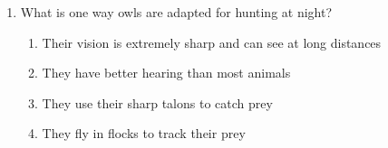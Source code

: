 \documentclass[12pt]{article}
\begin{document}
\begin{enumerate}
\vspace{0.5cm}

\item What is one way owls are adapted for hunting at night?
\begin{enumerate}[label=\Alph*.]
    \item Their vision is extremely sharp and can see at long distances
    \item They have better hearing than most animals
    \item They use their sharp talons to catch prey
    \item They fly in flocks to track their prey
\end{enumerate}

\end{enumerate}
\end{document}
